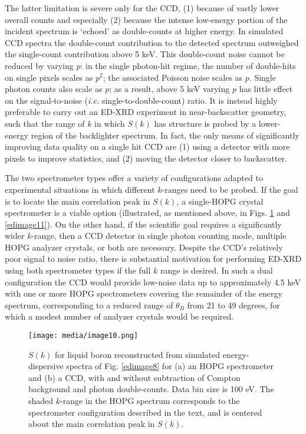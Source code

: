 The latter limitation is severe only for the CCD, (1) because of vastly
lower overall counts and especially (2) because the intense low-energy
portion of the incident spectrum is `echoed' as double-counts at higher
energy. In simulated CCD spectra the double-count contribution to the
detected spectrum outweighed the single-count contribution above 5 keV.
This double-count noise cannot be reduced by varying \(p\): in the
single photon-hit regime, the number of double-hits on single pixels
scales as \(p^{2}\); the associated Poisson noise scales as \(p\).
Single photon counts also scale as \(p\); as a result, above 5 keV
varying \(p\) has little effect on the signal-to-noise (\emph{i.e.}
single-to-double-count) ratio. It is instead highly preferable to carry
out an ED-XRD experiment in near-backscatter geometry, such that the
range of \(k\) in which \(S(k)\) has structure is probed by a
lower-energy region of the backlighter spectrum. In fact, the only means
of significantly improving data quality on a single hit CCD are (1)
using a detector with more pixels to improve statistics, and (2) moving
the detector closer to backscatter.

The two spectrometer types offer a variety of configurations adapted to
experimental situations in which different \(k\)-ranges need to be
probed. If the goal is to locate the main correlation peak in
\(S(k)\)\emph{,} a single-HOPG crystal spectrometer is a viable option
(illustrated, as mentioned above, in Figs. \ref{edimage10} and \ref{edimage11}). On the other
hand, if the scientific goal requires a significantly wider \(k\)-range,
then a CCD detector in single photon counting mode, multiple HOPG
analyzer crystals, or both are necessary. Despite the CCD's relatively
poor signal to noise ratio, there is substantial motivation for
performing ED-XRD using both spectrometer types if the full \(k\) range
is desired. In such a dual configuration the CCD would provide low-noise
data up to approximately 4.5 keV with one or more HOPG spectrometers
covering the remainder of the energy spectrum, corresponding to a
reduced range of \(\theta_{B}\) from 21 to 49 degrees, for which a
modest number of analyzer crystals would be required.

\begin{figure} 
\caption{ \(S(k)\) for liquid boron
reconstructed from simulated energy-dispersive spectra of Fig. \ref{edimage8} for (a)
an HOPG spectrometer and (b) a CCD, with and without subtraction of
Compton background and photon double-counts. Data bin size is 100 eV.
The shaded \(k\)-range in the HOPG spectrum corresponds to the
spectrometer configuration described in the text, and is centered about
the main correlation peak in \(S(k)\).}
\label{edimage10}
\centering
\texttt{[image: media/image10.png]}
\end{figure}



